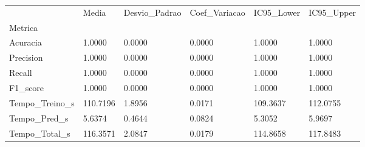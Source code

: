 \begin{tabular}{llllll}
\toprule
 & Media & Desvio_Padrao & Coef_Variacao & IC95_Lower & IC95_Upper \\
Metrica &  &  &  &  &  \\
\midrule
Acuracia & 1.0000 & 0.0000 & 0.0000 & 1.0000 & 1.0000 \\
Precision & 1.0000 & 0.0000 & 0.0000 & 1.0000 & 1.0000 \\
Recall & 1.0000 & 0.0000 & 0.0000 & 1.0000 & 1.0000 \\
F1_score & 1.0000 & 0.0000 & 0.0000 & 1.0000 & 1.0000 \\
Tempo_Treino_s & 110.7196 & 1.8956 & 0.0171 & 109.3637 & 112.0755 \\
Tempo_Pred_s & 5.6374 & 0.4644 & 0.0824 & 5.3052 & 5.9697 \\
Tempo_Total_s & 116.3571 & 2.0847 & 0.0179 & 114.8658 & 117.8483 \\
\bottomrule
\end{tabular}
